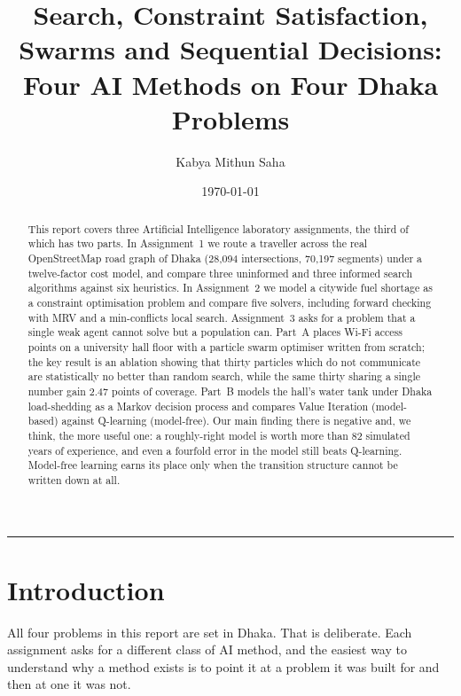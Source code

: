 \documentclass{ai-lab-report}
\title{Search, Constraint Satisfaction, Swarms and Sequential Decisions:\\
       Four AI Methods on Four Dhaka Problems}
\author{Kabya Mithun Saha}
\date{\today}
\begin{document}
\maketitle

\begin{abstract}
This report covers three Artificial Intelligence laboratory assignments, the third of
which has two parts. In Assignment~1 we route a traveller across the real
OpenStreetMap road graph of Dhaka (28{,}094 intersections, 70{,}197 segments) under a
twelve-factor cost model, and compare three uninformed and three informed search
algorithms against six heuristics. In Assignment~2 we model a citywide fuel shortage as
a constraint optimisation problem and compare five solvers, including forward checking
with MRV and a min-conflicts local search. Assignment~3 asks for a problem that a single
weak agent cannot solve but a population can. Part~A places Wi-Fi access points on a
university hall floor with a particle swarm optimiser written from scratch; the key
result is an ablation showing that thirty particles which do not communicate are
statistically no better than random search, while the same thirty sharing a single number
gain 2.47 points of coverage. Part~B models the hall's water tank under Dhaka load-shedding as a Markov
decision process and compares Value Iteration (model-based) against Q-learning
(model-free). Our main finding there is negative and, we think, the more useful
one: a roughly-right model is worth more than 82 simulated years of experience, and even a
fourfold error in the model still beats Q-learning. Model-free learning earns its place only
when the transition structure cannot be written down at all.
\end{abstract}

\vspace{5mm}
\noindent\rule{\textwidth}{0.4pt}

\section{Introduction}
All four problems in this report are set in Dhaka. That is deliberate. Each
assignment asks for a different class of AI method, and the easiest way to understand
why a method exists is to point it at a problem it was built for and then at one it was
not.
\end{document}
